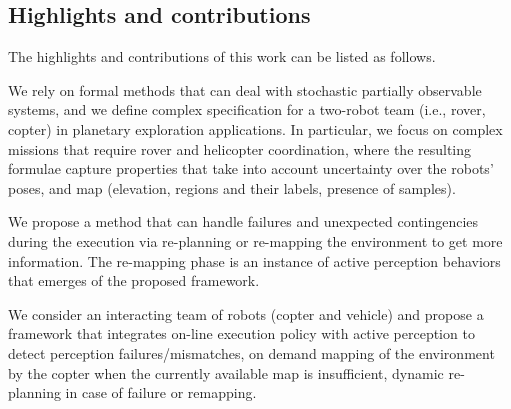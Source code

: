 \documentclass[conference]{IEEEtran}
\begin{document}
	\subsection{Highlights and contributions}
	The highlights and contributions of this work can be listed as follows.
	\begin{enumerate}
	
	{\color{orange}
	\item We rely on formal methods that can deal with stochastic partially observable systems, and we define complex specification for a two-robot team (i.e., rover, copter) in planetary exploration applications. In particular, we focus on complex missions that require rover and helicopter coordination, where the resulting formulae capture properties that take into account uncertainty
	over the robots' poses, and map (elevation, regions and their labels, presence of samples).
	
	
	
	
	\item We propose a method that can handle failures and unexpected contingencies during the execution via re-planning or re-mapping the environment to get more information. The re-mapping phase is an instance of active perception behaviors that emerges of the proposed framework.
	
	\item We consider an interacting team of robots (copter and vehicle) and
	propose a framework that integrates on-line execution policy with active
	perception to detect perception failures/mismatches, on demand mapping of
	the environment by the copter when the currently available map is insufficient,
	dynamic re-planning in case of failure or remapping.
	
}
\end{enumerate}
\end{document}
